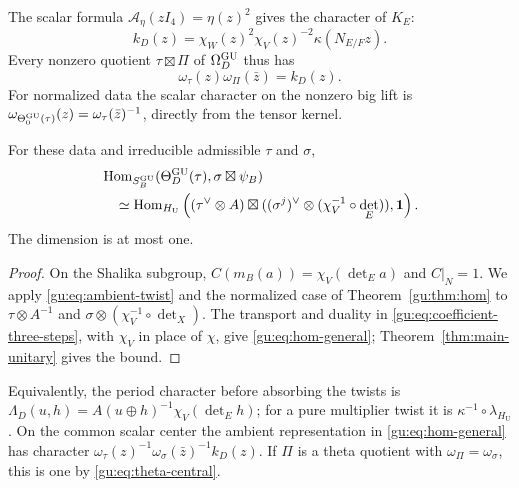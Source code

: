 The scalar formula $\mathcal A_\eta(zI_4)=\eta(z)^2$ gives the
character of $K_E$:
\begin{equation}\label{gu:eq:kernel-character}
 k_D(z)=\chi_W(z)^2\chi_V(z)^{-2}\kappa(N_{E/F}z).
\end{equation}
Every nonzero quotient $\tau\boxtimes\Pi$ of $\Omega_D^{\operatorname{GU}}$ thus has
\begin{equation}\label{gu:eq:theta-central}
 \omega_\tau(z)\omega_\Pi(\bar z)=k_D(z).
\end{equation}
For normalized data the scalar character on the nonzero big lift
is $\omega_{\Theta_0^{\operatorname{GU}}(\tau)}(z)=\omega_\tau(\bar z)^{-1}$,
directly from the tensor kernel.

\begin{proposition}
\label{gu:thm:hom-general}
For these data and irreducible admissible $\tau$ and $\sigma$,
\begin{equation}\label{gu:eq:hom-general}
 \begin{aligned}
 &\operatorname{Hom}_{S_B^{\operatorname{GU}}}(\Theta_D^{\operatorname{GU}}(\tau),\sigma\boxtimes\psi_B)\\
 &\quad\simeq\operatorname{Hom}_{H_{\mathrm U}}\left(
   (\tau^\vee\otimes A)\boxtimes
   ((\sigma^j)^\vee\otimes(\chi_V^{-1}\circ\det_E)),\mathbf1\right).
 \end{aligned}
\end{equation}
The dimension is at most one.
\end{proposition}
\begin{proof}
On the Shalika subgroup,
$C(m_B(a))=\chi_V(\det_Ea)$ and $C|_N=1$. We apply
\eqref{gu:eq:ambient-twist} and the normalized case of
Theorem~\ref{gu:thm:hom} to $\tau\otimes A^{-1}$ and
$\sigma\otimes(\chi_V^{-1}\circ\det_X)$. The transport and duality
in \eqref{gu:eq:coefficient-three-steps}, with $\chi_V$ in place of
$\chi$, give \eqref{gu:eq:hom-general}; Theorem~\ref{thm:main-unitary} gives
the bound.
\end{proof}
Equivalently, the period character before absorbing the twists is
$\Lambda_D(u,h)=A(u\oplus h)^{-1}\chi_V(\det_Eh)$; for a pure
multiplier twist it is $\kappa^{-1}\circ\lambda_{H_{\mathrm U}}$.
On the common scalar center the ambient representation in
\eqref{gu:eq:hom-general} has character
$\omega_\tau(z)^{-1}\omega_\sigma(\bar z)^{-1}k_D(z)$.
If $\Pi$ is a theta quotient with $\omega_\Pi=\omega_\sigma$, this
is one by \eqref{gu:eq:theta-central}.

